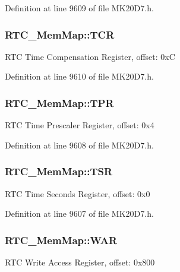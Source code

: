 Definition at line 9609 of file M\+K20\+D7.\+h.

\subsubsection[{\texorpdfstring{T\+CR}{TCR}}]{ R\+T\+C\+\_\+\+Mem\+Map\+::\+T\+CR}\hypertarget{struct_r_t_c___mem_map_ab816b0540497796070202cd2f5bc10ed}{}\label{struct_r_t_c___mem_map_ab816b0540497796070202cd2f5bc10ed}
R\+TC Time Compensation Register, offset\+: 0xC 

Definition at line 9610 of file M\+K20\+D7.\+h.

\subsubsection[{\texorpdfstring{T\+PR}{TPR}}]{ R\+T\+C\+\_\+\+Mem\+Map\+::\+T\+PR}\hypertarget{struct_r_t_c___mem_map_a32641b62d548255bdf2164b457a2aaeb}{}\label{struct_r_t_c___mem_map_a32641b62d548255bdf2164b457a2aaeb}
R\+TC Time Prescaler Register, offset\+: 0x4 

Definition at line 9608 of file M\+K20\+D7.\+h.

\subsubsection[{\texorpdfstring{T\+SR}{TSR}}]{ R\+T\+C\+\_\+\+Mem\+Map\+::\+T\+SR}\hypertarget{struct_r_t_c___mem_map_a4ca4d2878d99736cbff0e8b107a275f2}{}\label{struct_r_t_c___mem_map_a4ca4d2878d99736cbff0e8b107a275f2}
R\+TC Time Seconds Register, offset\+: 0x0 

Definition at line 9607 of file M\+K20\+D7.\+h.

\subsubsection[{\texorpdfstring{W\+AR}{WAR}}]{ R\+T\+C\+\_\+\+Mem\+Map\+::\+W\+AR}\hypertarget{struct_r_t_c___mem_map_aa3d2abe1fdd440a05339c38d377a2ee6}{}\label{struct_r_t_c___mem_map_aa3d2abe1fdd440a05339c38d377a2ee6}
R\+TC Write Access Register, offset\+: 0x800 

